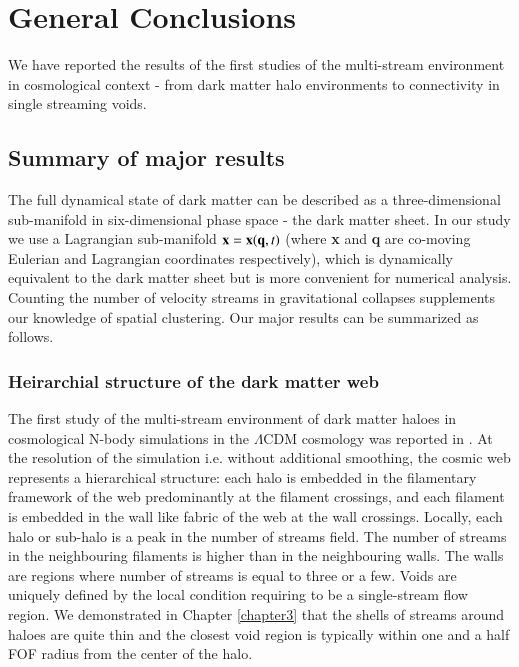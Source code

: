 
\chapter{General Conclusions}\label{chapter6}

We have reported the results of the first studies of the multi-stream environment in cosmological context - from dark matter halo environments to connectivity in single streaming voids. 


\section{Summary of major results}

The full dynamical state of  dark matter can be described as a three-dimensional sub-manifold
in six-dimensional phase space - the dark matter sheet. In our study we use a Lagrangian sub-manifold ${\bf x} = {\bf x}({\bf q},t)$ 
(where {\bf x} and {\bf q} are co-moving Eulerian and Lagrangian coordinates respectively), which 
is dynamically  equivalent to the dark matter sheet but is more convenient for numerical analysis. Counting the number of velocity streams in gravitational collapses supplements our knowledge of spatial clustering. Our major results can be summarized as follows.

\subsection{Heirarchial structure of the dark matter web}

The first study of the multi-stream environment of dark matter haloes in cosmological N-body simulations
in the $\Lambda$CDM cosmology was reported in \cite{Ramachandra2015}. At the resolution of the simulation i.e. without additional smoothing, the cosmic web represents a hierarchical structure: each halo is embedded in the filamentary framework of the web predominantly  at the filament crossings, and each filament is embedded in the wall like fabric of the web at the wall crossings. Locally, each halo or sub-halo is a peak in the number of streams field. The number of streams in the neighbouring filaments is higher than in the neighbouring walls. The walls are regions where number of streams is equal to three or a few. Voids are uniquely defined by the local condition requiring to be a single-stream flow region. We demonstrated in Chapter \ref{chapter3} that the shells of streams around haloes are quite thin and the closest void region is typically within one and a half FOF radius from the center of the halo.

